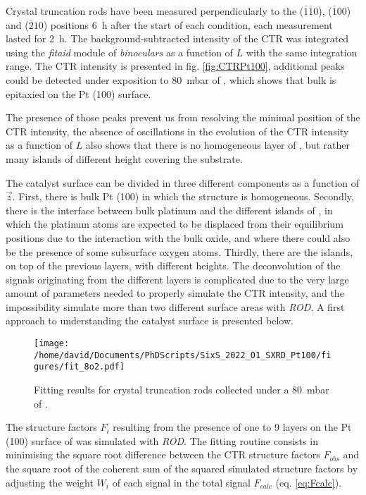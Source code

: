 Crystal truncation rods have been measured perpendicularly to the ($\bar{1}\bar{1}0$), ($\bar{1}00$) and ($\bar{2}10$) positions \qty{6}{\hour} after the start of each condition, each measurement lasted for \qty{2}{\hour}.
The background-subtracted intensity of the CTR was integrated using the \textit{fitaid} module of \textit{binoculars} as a function of $L$ with the same integration range.
The CTR intensity is presented in fig. \ref{fig:CTRPt100}, additional peaks could be detected under exposition to \qty{80}{\milli\bar} of , which shows that bulk  is epitaxied on the Pt (100) surface.

The presence of those peaks prevent us from resolving the minimal position of the CTR intensity, the absence of oscillations in the evolution of the CTR intensity as a function of $L$ also shows that there is no homogeneous layer of , but rather many islands of different height covering the substrate.

The catalyst surface can be divided in three different components as a function of $\vec{z}$.
First, there is bulk Pt (100) in which the structure is homogeneous.
Secondly, there is the interface between bulk platinum and the different islands of , in which the platinum atoms are expected to be displaced from their equilibrium positions due to the interaction with the bulk oxide, and where there could also be the presence of some subsurface oxygen atoms.
Thirdly, there are the  islands, on top of the previous layers, with different heights.
The deconvolution of the signals originating from the different layers is complicated due to the very large amount of parameters needed to properly simulate the CTR intensity, and the impossibility simulate more than two different surface areas with \textit{ROD}.
A first approach to understanding the catalyst surface is presented below.

\begin{figure}[!htb]
    \centering
    \texttt{[image: /home/david/Documents/PhDScripts/SixS\_2022\_01\_SXRD\_Pt100/figures/fit\_8o2.pdf]}
    \caption{
        Fitting results for crystal truncation rods collected under a \qty{80}{\milli\bar} of .
    }
    \label{fig:CTRFitHighOxygen}
\end{figure}

The structure factors $F_i$ resulting from the presence of one to 9 layers on the Pt (100) surface of  was simulated with \textit{ROD}.
The fitting routine consists in minimising the square root difference between the CTR structure factors $F_{obs}$ and the square root of the  coherent sum of the squared simulated structure factors by adjusting the weight $W_i$ of each signal in the total signal $F_{calc}$ (eq. \ref{eq:Fcalc}).

